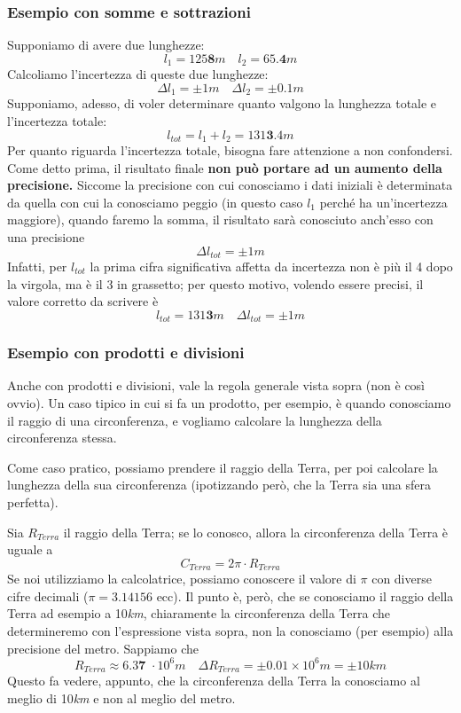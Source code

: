 \subsubsection{Esempio con somme e sottrazioni}
Supponiamo di avere due lunghezze:
$$ l_{1} = 125\textbf{8}m  \quad l_{2} = 65.\textbf{4}m $$
Calcoliamo l'incertezza di queste due lunghezze:
$$ \Delta l_{1} = \pm 1m  \quad \Delta l_{2} = \pm 0.1m $$
Supponiamo, adesso, di voler determinare quanto valgono la lunghezza totale e l'incertezza totale:
$$ l_{tot} = l_{1} + l_{2} = 131\textbf{3}.4m $$
Per quanto riguarda l'incertezza totale, bisogna fare attenzione a non confondersi. Come detto prima, il risultato finale \textbf{non può portare ad un aumento della precisione.} Siccome la precisione con cui conosciamo i dati iniziali è determinata da quella con cui la conosciamo peggio (in questo caso $l_{1}$ perché ha un'incertezza maggiore), quando faremo la somma, il risultato sarà conosciuto anch'esso con una precisione
$$ \Delta l_{tot} = \pm 1m $$
Infatti,  per $l_{tot}$ la prima cifra significativa affetta da incertezza non è più il 4 dopo la virgola, ma è il 3 in grassetto; per questo motivo, volendo essere precisi, il valore corretto da scrivere è
$$ l_{tot} = 131\textbf{3}m \quad  \Delta l_{tot} = \pm 1m $$

\subsubsection{Esempio con prodotti e divisioni}
Anche con prodotti e divisioni, vale la regola generale vista sopra (non è così ovvio). Un caso tipico in cui si fa un prodotto, per esempio, è quando conosciamo il raggio di una circonferenza, e vogliamo calcolare la lunghezza della circonferenza stessa.

Come caso pratico, possiamo prendere il raggio della Terra, per poi calcolare la lunghezza della sua circonferenza (ipotizzando però, che la Terra sia una sfera perfetta).

Sia $ R_{Terra}$ il raggio della Terra; se lo conosco, allora la circonferenza della Terra è uguale a
$$ C_{Terra} = 2 \pi \cdot R_{Terra}$$
Se noi utilizziamo la calcolatrice, possiamo conoscere il valore di $\pi$ con diverse cifre decimali ($\pi = 3.14156$ ecc). Il punto è, però, che se conosciamo il raggio della Terra ad esempio a 10\textit{km}, chiaramente la circonferenza della Terra che determineremo con l'espressione vista sopra, non la conosciamo (per esempio) alla precisione del metro. Sappiamo che 
$$ R_{Terra} \approx 6.3\textbf{7 }\cdot 10^{6}m \quad  \Delta R_{Terra} = \pm 0.01 \times 10^{6} m = \pm 10km $$
Questo fa vedere, appunto, che la circonferenza della Terra la conosciamo al meglio di 10\textit{km} e non al meglio del metro.

